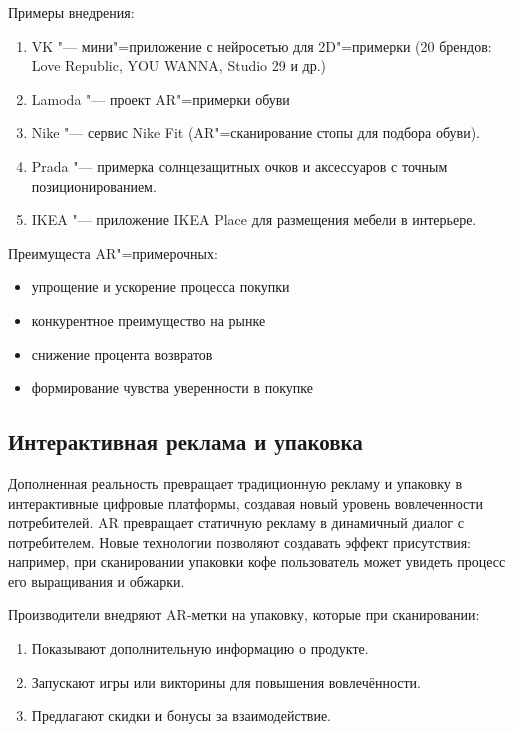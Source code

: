 Примеры внедрения:
\begin{enumerate}
    \item VK "--- мини"=приложение с нейросетью для 2D"=примерки (20 брендов: Love Republic, YOU WANNA, Studio 29 и др.)
    \item Lamoda "--- проект AR"=примерки обуви
    \item Nike "--- сервис Nike Fit (AR"=сканирование стопы для подбора обуви). 
    \item Prada "--- примерка солнцезащитных очков и аксессуаров с точным позиционированием.
    \item IKEA "--- приложение IKEA Place для размещения мебели в интерьере.
\end{enumerate}

Преимущеста AR"=примерочных:
\begin{itemize}
    \item упрощение и ускорение процесса покупки
    \item конкурентное преимущество на рынке
    \item снижение процента возвратов
    \item формирование чувства уверенности в покупке 
\end{itemize}



\subsection{Интерактивная реклама и упаковка}
Дополненная реальность превращает традиционную рекламу и упаковку в интерактивные цифровые платформы, создавая новый уровень вовлеченности потребителей. AR превращает статичную рекламу в динамичный диалог с потребителем. Новые технологии позволяют создавать эффект присутствия: например, при сканировании упаковки кофе пользователь может увидеть процесс его выращивания и обжарки.

Производители внедряют AR-метки на упаковку, которые при сканировании:
\begin{enumerate}
    \item Показывают дополнительную информацию о продукте.
    \item Запускают игры или викторины для повышения вовлечённости.
    \item Предлагают скидки и бонусы за взаимодействие.
\end{enumerate}
 
